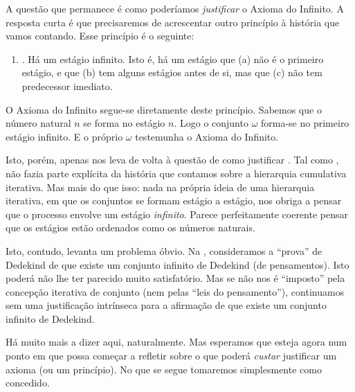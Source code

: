 \documentclass[../../../include/open-logic-section]{subfiles}
\begin{document}
A questão que permanece é como poderíamos \emph{justificar} o Axioma
do Infinito. A resposta curta é que precisaremos de acrescentar outro
princípio à história que vamos contando. Esse princípio é o
seguinte:
\begin{enumerate}
	\item[] \stagesinf. Há um estágio infinito. Isto é, há um estágio que (a) não é o primeiro estágio, e que (b) tem alguns estágios antes de si, mas que (c) não tem predecessor imediato.
\end{enumerate}
O Axioma do Infinito segue-se diretamente deste princípio.
Sabemos que o número natural $n$ se forma no estágio $n$. Logo o conjunto
$\omega$ forma-se no primeiro estágio infinito. E o próprio $\omega$
testemunha o Axioma do Infinito. 

Isto, porém, apenas nos leva de volta à questão de como justificar
\stagesinf. Tal como \stagessucc, não fazia parte explícita
da história que contamos sobre a hierarquia cumulativa iterativa. Mas
mais do que isso: nada na própria ideia de uma hierarquia iterativa, em
que os conjuntos se formam estágio a estágio, nos obriga a pensar que o
processo envolve um estágio \emph{infinito}. Parece perfeitamente coerente
pensar que os estágios estão ordenados como os números naturais. 

Isto, contudo, levanta um problema óbvio. Na
, consideramos a
``prova'' de Dedekind de que existe um conjunto infinito de Dedekind (de
pensamentos). Isto poderá não lhe ter parecido muito satisfatório. Mas se
\stagesinf{} não nos é ``imposto'' pela concepção iterativa de
conjunto (nem pelas ``leis do pensamento''), continuamos sem uma
justificação intrínseca para a afirmação de que existe um conjunto infinito de
Dedekind.

Há muito mais a dizer aqui, naturalmente. Mas esperamos que esteja agora
num ponto em que possa começar a refletir sobre o que poderá \emph{custar}
justificar um axioma (ou um princípio). No que se segue tomaremos simplesmente
\stagesinf{} como concedido.
\end{document}
